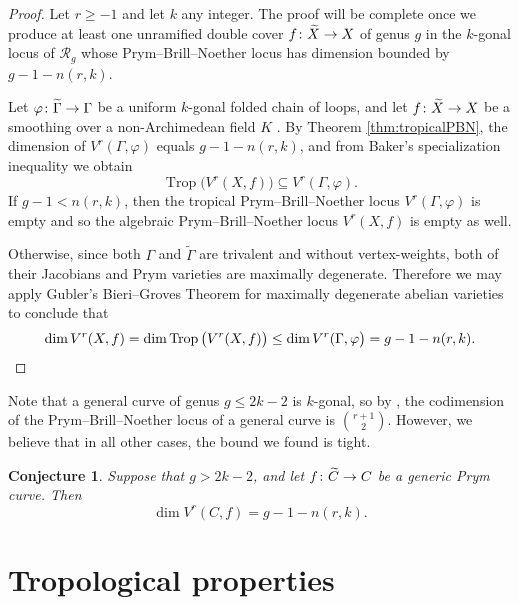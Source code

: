 \documentclass[11pt,reqno]{amsart}
\newcommand*{\cR}{\mathcal{R}}
\newcommand*{\maps}{\nobreak\mskip2mu\mathpunct{}\nonscript
  \mkern-\thinmuskip{:}\mskip6muplus1mu\relax}
\newcommand*{\wti}[1]{\widetilde{#1}}
\DeclareMathOperator{\trop}{Trop}
\theoremstyle{definition}
\theoremstyle{problem}
\theoremstyle{plain}
\newtheorem{conjecture}[definition]{Conjecture}
\theoremstyle{remark}
\theoremstyle{theorem}
\numberwithin{equation}{section}
\numberwithin{figure}{section}
\theoremstyle{definition}
\theoremstyle{problem}
\theoremstyle{plain}
\begin{document}
\algebraicPBN*
\begin{proof}
  Let $r\geq -1$ and let $k$ any integer.  The proof will be complete
  once we produce at least one unramified double cover
  $f \maps \wti{X} \to X$ of genus $g$ in the $k$-gonal locus of
  $\cR_g$ whose Prym--Brill--Noether locus has dimension bounded by
  $g-1-n(r,k)$.
  
  Let $\varphi\maps\wti\Gamma\rightarrow \Gamma$ be a uniform
  $k$-gonal folded chain of loops, and let
  $f\maps \wti{X}\rightarrow X$ be a smoothing over a non-Archimedean
  field $K$ \cite[Lemma~7.0.1]{len2019skeletons}.  By Theorem
  \ref{thm:tropicalPBN}, the dimension of $V^r(\Gamma,\varphi)$ equals
  $g-1-n(r,k)$, and from Baker's specialization inequality
  \cite[Corollary 2.11]{Baker_specialization} we obtain
  \begin{equation*}
  \trop\big(V^r(X,f)\big) \subseteq V^r(\Gamma,\varphi).
  \end{equation*} 
  If $g-1<n(r,k)$, then the tropical Prym--Brill--Noether locus $V^r(\Gamma,\varphi)$ is empty and so the algebraic Prym--Brill--Noether locus  $V^{r}(X,f)$ is empty as well.   
  
  Otherwise, since both $\Gamma$ and $\wti\Gamma$ are trivalent and without vertex-weights, both of their Jacobians and  Prym varieties are maximally degenerate. Therefore we may apply Gubler's Bieri--Groves Theorem for maximally degenerate abelian varieties  \cite[Theorem 6.9]{Gubler_trop&nonArch} to conclude that 
  \begin{equation*}
  \dim V^r(X,f)=\dim \trop\big(V^r(X,f)\big)\leq \dim V^r(\Gamma,\varphi\big)=g-1-n(r,k).\qedhere
  \end{equation*}
\end{proof}

Note that a general curve of genus $g\leq 2k-2$ is $k$-gonal, so by \cite{Welters_Prym}, the codimension of the Prym--Brill--Noether locus of a general curve is $\binom{r+1}{2}$. However, we believe that in all other cases, the bound we found is tight. 
\begin{conjecture}
  Suppose that $g> 2k-2$, and let  $f\maps\wti{C}\to C$ be a generic Prym curve. Then 
  \[
  \dim V^r(C,f) = g-1-n(r,k).
  \]
\end{conjecture}

\section{Tropological properties}\label{sec:trop-results}
\end{document}
